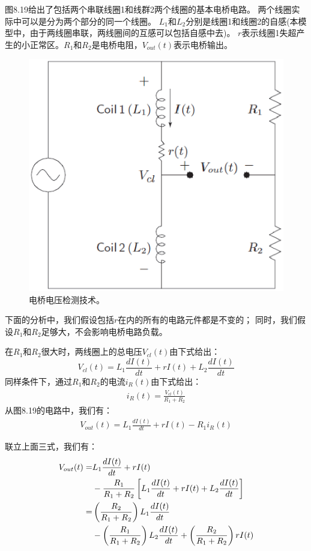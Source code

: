 图8.19给出了包括两个串联线圈1和线群2两个线圈的基本电桥电路。
两个线圈实际中可以是分为两个部分的同一个线圈。
$L_1$和$L_2$分别是线圈1和线圈2的自感(本模型中，由于两线圈串联，两线圈间的互感可以包括自感中去)。
$r$表示线圈1失超产生的小正常区。$R_1$和$R_2$是电桥电阻，$V_{out}(t)$表示电桥输出。

\begin{figure}
	\centering
	\includegraphics[scale=0.5]{chpt8/figs/fig8.19.eps}
	\caption{电桥电压检测技术。}
\end{figure}

下面的分析中，我们假设包括$r$在内的所有的电路元件都是不变的；
同时，我们假设$R_1$和$R_2$足够大，不会影响电桥电路负载。

在$R_1$和$R_2$很大时，两线圈上的总电压$V_{cl}(t)$由下式给出：
\begin{equation}%
V_{cl}(t)=L_1\frac{dI(t)}{dt}+rI(t)+L_2\frac{dI(t)}{dt}
\end{equation}
同样条件下，通过$R_1$和$R_2$的电流$i_R(t)$由下式给出：
\begin{align*}%
i_R(t)=\frac{V_{cl}(t)}{R_1+R_2} \tag{8.66b}
\end{align*}
从图8.19的电路中，我们有：
\begin{align*}%
V_{out}(t)=L_1\frac{dI(t)}{dt}+rI(t)-R_1i_R(t) \tag{8.66c}
\end{align*}

联立上面三式，我们有：
\begin{align}%
V_{out}(t)=&L_1\frac{dI(t)}{dt}+rI(t) \\\notag
&-\frac{R_1}{R_1+R_2}\left[L_1\frac{dI(t)}{dt}+rI(t)+L_2\frac{dI(t)}{dt}\right] \\\notag
=&\left(\frac{R_2}{R_1+R_2}\right)L_1\frac{dI(t)}{dt} \\\notag
&-\left(\frac{R_1}{R_1+R_2}\right)L_2\frac{dI(t)}{dt}+\left(\frac{R_2}{R_1+R_2}\right)rI(t)
\end{align}

